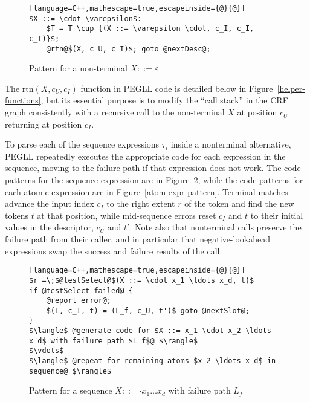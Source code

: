 \documentclass{article}
\begin{document}
\begin{figure}
\caption[Empty non-terminal code pattern]{Pattern for a non-terminal $X ::= \varepsilon$} \label{empty-nt-pattern}
\begin{lstlisting}[language=C++,mathescape=true,escapeinside={@}{@}]
$X ::= \cdot \varepsilon$:
	$T = T \cup {(X ::= \varepsilon \cdot, c_I, c_I, c_I)}$;
	@rtn@$(X, c_U, c_I)$; goto @nextDesc@;
\end{lstlisting}
\end{figure}

The rtn$(X, c_U, c_I)$ function in PEGLL code is detailed below in Figure~\ref{helper-functions}, but its essential purpose is to modify the ``call stack'' in the CRF graph consistently with a recursive call to the non-terminal $X$ at position $c_U$ returning at position $c_I$.

To parse each of the sequence expressions $\tau_i$ inside a nonterminal alternative, PEGLL repeatedly executes the appropriate code for each expression in the sequence, moving to the failure path if that expression does not work. 
The code patterns for the sequence expression are in Figure~\ref{seq-expr-pattern}, while the code patterns for each atomic expression are in Figure~\ref{atom-expr-pattern}. 
Terminal matches advance the input index $c_I$ to the right extent $r$ of the token and find the new tokens $t$ at that position, while mid-sequence errors reset $c_I$ and $t$ to their initial values in the descriptor, $c_U$ and $t'$.
Note also that nonterminal calls preserve the failure path from their caller, and in particular that negative-lookahead expressions swap the success and failure results of the call.

\begin{figure}
\caption[Sequence expression code pattern]{Pattern for a sequence $X ::= \cdot x_1 \ldots x_d$ with failure path $L_f$} \label{seq-expr-pattern}
\begin{lstlisting}[language=C++,mathescape=true,escapeinside={@}{@}]
$r =\;$@testSelect@$(X ::= \cdot x_1 \ldots x_d, t)$
if @testSelect failed@ {
	@report error@;
	$(L, c_I, t) = (L_f, c_U, t')$ goto @nextSlot@;
}
$\langle$ @generate code for $X ::= x_1 \cdot x_2 \ldots x_d$ with failure path $L_f$@ $\rangle$
$\vdots$
$\langle$ @repeat for remaining atoms $x_2 \ldots x_d$ in sequence@ $\rangle$
\end{lstlisting}
\end{figure}
\end{document}
